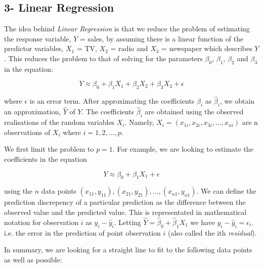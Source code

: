\documentclass[11pt]{article}
\begin{document}
    \subsection{3- Linear Regression}\label{linear-regression}

The idea behind \emph{Linear Regression} is that we reduce the problem
of estimating the response variable, \(Y\) = sales, by assuming there is
a linear function of the predictor variables, \(X_1\) = TV, \(X_2\) =
radio and \(X_3\) = newspaper which describes \(Y\). This reduces the
problem to that of solving for the parameters \(\beta_0\), \(\beta_1\),
\(\beta_2\) and \(\beta_3\) in the equation:

\[Y \approx \beta_0 + \beta_1 X_1 + \beta_2 X_2 + \beta_3 X_3 + \epsilon\]

where \(\epsilon\) is an error term. After approximating the
coefficients \(\beta_i\) as \(\hat{\beta}_i\), we obtain an
approximation, \(\hat{Y}\) of \(Y\). The coefficients \(\hat{\beta}_i\)
are obtained using the observed realisations of the random variables
\(X_i\). Namely, \(X_i = (x_{1i},x_{2i},x_{3i},...,x_{ni})\) are n
observations of \(X_i\) where \(i = 1,2,...,p\).

We first limit the problem to \(p=1\). For example, we are looking to
estimate the coefficients in the equation

\[Y \approx \beta_0 + \beta_1 X_1 + \epsilon\]

using the \(n\) data points
\((x_{11},y_{11}),(x_{21},y_{21}),...,(x_{n1},y_{n1})\). We can define
the prediction discrepency of a particular prediction as the difference
between the observed value and the predicted value. This is
representated in mathematical notation for observation \(i\) as
\(y_i - \hat{y}_i\). Letting
\(\hat{Y} = \hat{\beta}_0 + \hat{\beta}_1 X_1\) we have
\(y_i - \hat{y}_i = \epsilon_i\). i.e. the error in the prediction of
point observation \(i\) (also called the ith \emph{residual}).

In summary, we are looking for a straight line to fit to the following
data points as well as possible:
\end{document}
